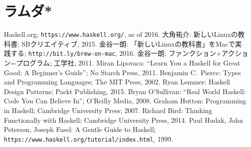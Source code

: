 \documentclass[a4paper]{jsbook}
\newcommand{\programminglanguage}[1]{\textsf{#1}}
\newcommand{\cxx}{\programminglanguage{C}\texttt{++}}
\begin{document}

\section{ラムダ*}




\begin{thebibliography}{99}
 Haskell.org; \texttt{https://www.haskell.org/}, as of 2016.
 大角祐介: 新しいLinuxの教科書; SBクリエイティブ, 2015.
 金谷一朗: 「新しいLinuxの教科書」をMacで実践する; \texttt{http://bit.ly/brew-on-mac}, 2016.
 金谷一朗: ファンクション+アクション=プログラム; 工学社, 2011.
Miran Lipovaca: ``Learn You a Haskell for Great Good: A Beginner's Guide''; No Starch Press, 2011.
 Benjamin C.~Pierce: Types and Programming Languages; The MIT Press, 2002.
 Ryan Lemmer: Haskell Design Patterns; Packt Publishing, 2015.
 Bryan O'Sullivan: ``Real World Haskell: Code You Can Believe In''; O'Reilly Media, 2008.
 Graham Hutton: Programming in Haskell; Cambridge University Press; 2007.
 Richard Bird: Thinking Functionally with Haskell; Cambridge University Press, 2014.
 Paul Hudak, John Peterson, Joseph Fasel: A Gentle Guide to Haskell; \texttt{https://www.haskell.org/tutorial/index.html}, 1999.
\end{thebibliography}
\end{document}
